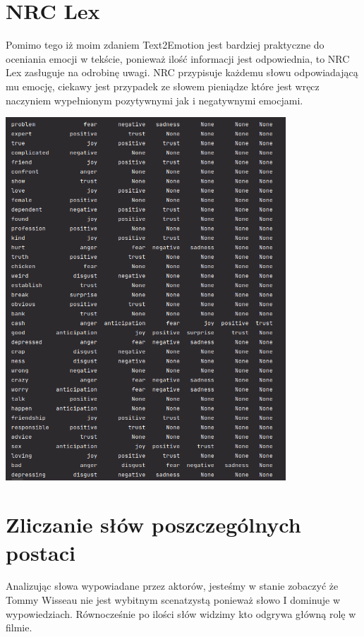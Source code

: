 \documentclass[a4paper,12pt]{article}
\begin{document}
	\section {NRC Lex}
	Pomimo tego iż moim zdaniem Text2Emotion jest bardziej praktyczne do oceniania emocji w tekście, ponieważ ilość informacji jest odpowiednia, to NRC Lex zasługuje na odrobinę uwagi. NRC przypisuje każdemu słowu odpowiadającą mu emocję, ciekawy jest przypadek ze słowem pieniądze które jest wręcz naczyniem wypełnionym pozytywnymi jak i negatywnymi emocjami.\\
	\begin{center}
	{\includegraphics[width=10.5cm]{NRCWords.png}}
	\end{center}
	\clearpage
	\section {Zliczanie słów poszczególnych postaci}
	Analizując słowa wypowiadane przez aktorów, jesteśmy w stanie zobaczyć że Tommy Wisseau nie jest wybitnym scenatzystą ponieważ słowo I dominuje w wypowiedziach.
	Równocześnie po ilości słów widzimy kto odgrywa główną rolę w filmie.
\end{document}

